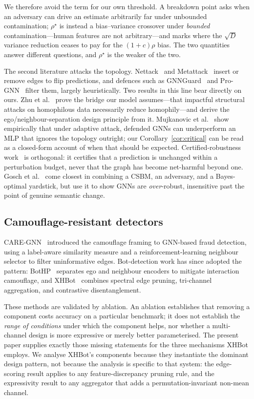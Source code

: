 \documentclass[onecolumn,pdflatex,sn-basic,Numbered]{sn-jnl}
\theoremstyle{thmstyleone}
\theoremstyle{thmstylethree}
\begin{document}
We therefore avoid the term for our own threshold. A breakdown point asks when an
adversary can drive an estimate arbitrarily far under unbounded contamination;
$\rho^\star$ is instead a bias--variance crossover under \emph{bounded}
contamination---human features are not arbitrary---and marks where the $\sqrt{D}$
variance reduction ceases to pay for the $(1+c)\rho$ bias. The two quantities answer
different questions, and $\rho^\star$ is the weaker of the two.

The second literature attacks the topology. Nettack~\citep{zugner2018adversarial} and
Metattack~\citep{zugner2019adversarial} insert or remove edges to flip predictions,
and defences such as GNNGuard~\citep{zhang2020gnnguard} and
Pro-GNN~\citep{jin2020graph} filter them, largely heuristically. Two results in this
line bear directly on ours. Zhu et al.~\citep{zhu2022how} prove the bridge our model
assumes---that impactful structural attacks on homophilous data necessarily reduce
homophily---and derive the ego/neighbour-separation design principle from it.
Mujkanovic et al.~\citep{mujkanovic2022are} show empirically that under adaptive
attack, defended GNNs can underperform an MLP that ignores the topology outright;
our Corollary~\ref{cor:critical} can be read as a closed-form account of when that
should be expected. Certified-robustness work~\citep{bojchevski2019certifiable} is
orthogonal: it certifies that a prediction is unchanged within a perturbation
budget, never that the graph has become net-harmful beyond one. Gosch
et al.~\citep{gosch2023revisiting} come closest in combining a CSBM, an adversary,
and a Bayes-optimal yardstick, but use it to show GNNs are \emph{over}-robust,
insensitive past the point of genuine semantic change.

\subsection{Camouflage-resistant detectors}

CARE-GNN~\citep{dou2020caregnn} introduced the camouflage framing to GNN-based fraud
detection, using a label-aware similarity measure and a reinforcement-learning
neighbour selector to filter uninformative edges. Bot-detection work has since
adopted the pattern: BotHP~\citep{he2025bothp} separates ego and neighbour encoders
to mitigate interaction camouflage, and XHBot~\citep{dang2026xhbot} combines
spectral edge pruning, tri-channel aggregation, and contrastive disentanglement.

These methods are validated by ablation. An ablation establishes that removing a
component costs accuracy on a particular benchmark; it does not establish the
\emph{range of conditions} under which the component helps, nor whether a
multi-channel design is more expressive or merely better parameterised. The present
paper supplies exactly those missing statements for the three mechanisms XHBot
employs. We analyse XHBot's components because they instantiate the dominant design
pattern, not because the analysis is specific to that system: the edge-scoring
result applies to any feature-discrepancy pruning rule, and the expressivity result
to any aggregator that adds a permutation-invariant non-mean channel.
\end{document}
